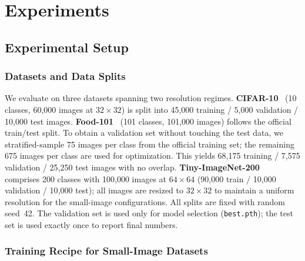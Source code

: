 \documentclass[conference]{IEEEtran}
\begin{document}
\section{Experiments}
\label{sec:experiments}

\subsection{Experimental Setup}

\subsubsection{Datasets and Data Splits}

We evaluate on three datasets spanning two resolution regimes.
\textbf{CIFAR-10}~\cite{Krizhevsky2009Cifar} (10 classes, 60{,}000
images at $32\!\times\!32$) is split into 45{,}000 training /
5{,}000 validation / 10{,}000 test images.
\textbf{Food-101}~\cite{Bossard2014Food101} (101 classes, 101{,}000
images) follows the official train/test split. To obtain a validation
set without touching the test data, we stratified-sample 75 images per
class from the official training set; the remaining 675 images per
class are used for optimization. This yields 68{,}175 training /
7{,}575 validation / 25{,}250 test images with no overlap.
\textbf{Tiny-ImageNet-200}~\cite{Le2015TinyImageNet} comprises 200
classes with 100{,}000 images at $64\!\times\!64$ (90{,}000 train /
10{,}000 validation / 10{,}000 test); all images are resized to
$32\!\times\!32$ to maintain a uniform resolution for the small-image
configurations. All splits are fixed with random seed~42. The
validation set is used only for model selection (\texttt{best.pth});
the test set is used exactly once to report final numbers.

\subsubsection{Training Recipe for Small-Image Datasets}
\end{document}
